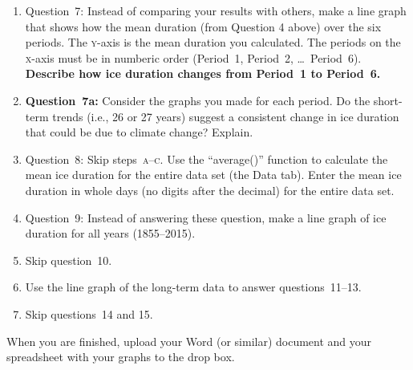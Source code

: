 \documentclass[12pt]{exam}
\begin{document}
\begin{enumerate}
\item Question~7: Instead of comparing your results with others, make a line graph that shows how the mean duration (from Question 4 above) over the six periods. The \textsc{y}-axis is the mean duration you calculated. The periods on the \textsc{x}-axis must be in numberic order (Period~1, Period~2, \dots~Period~6). \textbf{Describe how ice duration changes from Period~1 to Period~6.}

\item \textbf{Question~7a:} Consider the graphs you made for each period. Do the short-term trends (i.e., 26 or 27 years) suggest a consistent change in ice duration that could be due to climate change? Explain.

\item Question~8: Skip steps~\textsc{a–c}. Use the “average()” function to calculate the 
mean ice duration for the entire data set (the Data tab). Enter the mean ice duration in whole days (no digits after the decimal) for the entire data set.

\item Question~9: Instead of answering these question, make a line graph of ice duration for all years (1855–2015).

\item Skip question~10.

\item Use the line graph of the long-term data to answer questions~11–13.

\item Skip questions~14 and 15.

\end{enumerate}

When you are finished, upload your Word (or similar) document and your spreadsheet with your graphs to the drop box.
\end{document}
